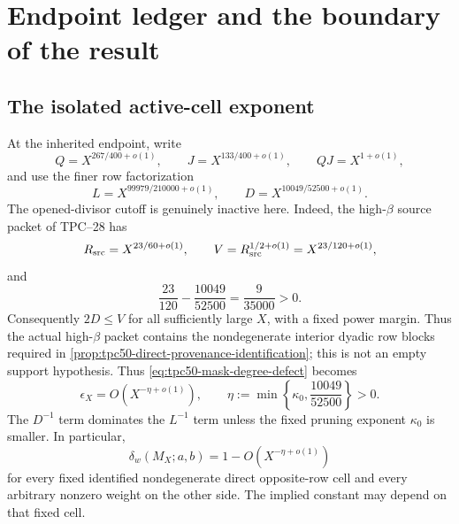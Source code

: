 \section{Endpoint ledger and the boundary of the result}
\label{sec:tpc50-endpoint-boundaries}

\subsection{The isolated active-cell exponent}

At the inherited endpoint, write
\begin{equation}
 Q=X^{267/400+o(1)},
 \qquad
 J=X^{133/400+o(1)},
 \qquad QJ=X^{1+o(1)},
 \label{eq:tpc50-endpoint-QJ}
\end{equation}
and use the finer row factorization
\begin{equation}
 L=X^{99979/210000+o(1)},
 \qquad
 D=X^{10049/52500+o(1)}.
 \label{eq:tpc50-endpoint-LD}
\end{equation}
The opened-divisor cutoff is genuinely inactive here.  Indeed, the
high-\(\beta\) source packet of TPC--28 has \citep{WangTPC28}
\begin{equation}
 R_{\rm src}=X^{23/60+o(1)},
 \qquad
 V=R_{\rm src}^{1/2+o(1)}=X^{23/120+o(1)},
 \label{eq:tpc50-endpoint-RV}
\end{equation}
and
\begin{equation}
 \frac{23}{120}-\frac{10049}{52500}
 =\frac9{35000}>0.
 \label{eq:tpc50-endpoint-interior-margin}
\end{equation}
Consequently \(2D\leq V\) for all sufficiently large \(X\), with a
fixed power margin.  Thus the actual high-\(\beta\) packet contains the
nondegenerate interior dyadic row blocks required in
\cref{prop:tpc50-direct-provenance-identification}; this is not an empty
support hypothesis.
Thus \eqref{eq:tpc50-mask-degree-defect} becomes
\begin{equation}
 \epsilon_X
 =O\!\left(X^{-\eta+o(1)}\right),
 \qquad
 \eta:=\min\left\{\kappa_0,\frac{10049}{52500}\right\}>0.
 \label{eq:tpc50-endpoint-degree-defect}
\end{equation}
The \(D^{-1}\) term dominates the \(L^{-1}\) term unless the fixed
pruning exponent \(\kappa_0\) is smaller.  In particular,
\begin{equation}
 \delta_w(M_X;a,b)
 =1-O\!\left(X^{-\eta+o(1)}\right)
 \label{eq:tpc50-endpoint-survival}
\end{equation}
for every fixed identified nondegenerate direct opposite-row cell and
every arbitrary nonzero weight on the other side.  The implied constant
may depend on that fixed cell.

